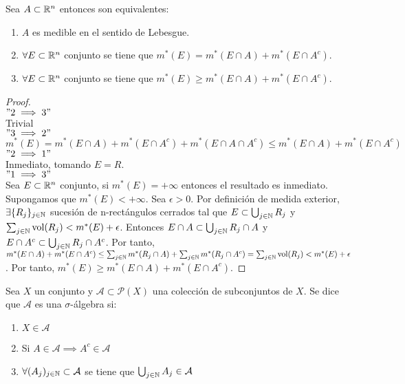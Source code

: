 \begin{proposición}
Sea $A \subset \mathbb{R}^n$ entonces son equivalentes:
\begin{enumerate}
    \item $A$ es medible en el sentido de Lebesgue.
    \item $\forall E \subset \mathbb{R}^n$ conjunto se tiene que $m^*(E) = m^*(E \cap A) + m^*(E \cap A^c)$.
    \item $\forall E \subset \mathbb{R}^n$ conjunto se tiene que $m^*(E) \geq m^*(E \cap A) + m^*(E \cap A^c)$.
\end{enumerate}
\end{proposición}

\begin{proof}
    \leavevmode\\
    $"2 \implies 3"$\\
    Trivial\\
    $"3 \implies 2"$\\
    $m^*(E) = m^*(E \cap A) + m^*(E \cap A^c) + m^*(E \cap A \cap A^c) \leq m^*(E \cap A) + m^*(E \cap A^c)$\\
    $"2 \implies 1"$\\
    Inmediato, tomando $E = R$.\\
    $"1 \implies 3"$\\
    Sea $E \subset \mathbb{R}^n$ conjunto, si $m^*(E) = +\infty$ entonces el resultado es inmediato. Supongamos que $m^*(E) < +\infty$. Sea $\epsilon > 0$. Por definición de medida exterior, $\exists \{R_j\}_{j \in \mathbb{N}}$ sucesión de n-rectángulos cerrados tal que $E \subset \bigcup_{j \in \mathbb{N}} R_j$ y $\sum_{j \in \mathbb{N}} \text{vol}(R_j) < m^*(E) + \epsilon$. Entonces $E \cap A \subset \bigcup_{j \in \mathbb{N}} R_j \cap A$ y $E \cap A^c \subset \bigcup_{j \in \mathbb{N}} R_j \cap A^c$. Por tanto, $m^*(E \cap A) + m^*(E \cap A^c) \leq \sum_{j \in \mathbb{N}} m^*(R_j \cap A) + \sum_{j \in \mathbb{N}} m^*(R_j \cap A^c) = \sum_{j \in \mathbb{N}} \text{vol}(R_j) < m^*(E) + \epsilon$. Por tanto, $m^*(E) \geq m^*(E \cap A) + m^*(E \cap A^c)$.
\end{proof}

\label{sigma-Algebra}
\begin{definición}
Sea $X$ un conjunto y $\mathcal{A} \subset \mathcal{P}(X)$ una colección de subconjuntos de $X$. Se dice que $\mathcal{A}$ es una $\sigma$-álgebra si:
\begin{enumerate}
    \item $X \in \mathcal{A}$
    \item Si $A \in \mathcal{A} \implies A^c \in \mathcal{A}$
    \item $\forall (A_j)_{j \in \mathbb{N}} \subset \mathcal{A}$ se tiene que $\bigcup_{j \in \mathbb{N}} A_j \in \mathcal{A}$
\end{enumerate}
\end{definición}

